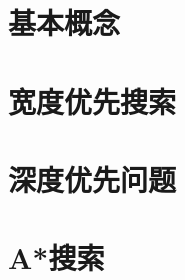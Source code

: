 
\section{基本概念}

\newpage
\section{宽度优先搜索}

\newpage
\section{深度优先问题}

\newpage
\section{A*搜索}

\newpage
